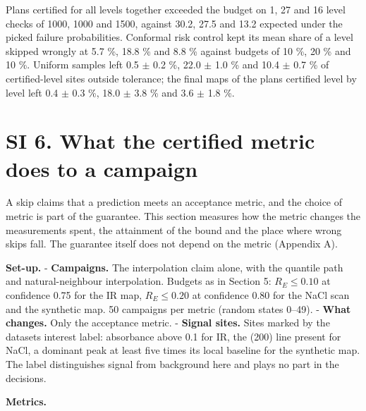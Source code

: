 \documentclass{iopjournal}
\begin{document}
Plans certified for all levels together exceeded the budget on 1, 27 and 16 level checks of 1000, 1000 and 1500, against 30.2, 27.5 and 13.2 expected under the picked failure probabilities. Conformal risk control kept its mean share of a level skipped wrongly at 5.7 \%, 18.8 \% and 8.8 \% against budgets of 10 \%, 20 \% and 10 \%. Uniform samples left 0.5 \ensuremath{\pm} 0.2 \%, 22.0 \ensuremath{\pm} 1.0 \% and 10.4 \ensuremath{\pm} 0.7 \% of certified-level sites outside tolerance; the final maps of the plans certified level by level left 0.4 \ensuremath{\pm} 0.3 \%, 18.0 \ensuremath{\pm} 3.8 \% and 3.6 \ensuremath{\pm} 1.8 \%.

\hypertarget{si-6.-what-the-certified-metric-does-to-a-campaign}{%
\section*{SI 6. What the certified metric does to a campaign}\label{si-6.-what-the-certified-metric-does-to-a-campaign}}

A skip claims that a prediction meets an acceptance metric, and the choice of metric is part of the guarantee. This section measures how the metric changes the measurements spent, the attainment of the bound and the place where wrong skips fall. The guarantee itself does not depend on the metric (Appendix A).

\textbf{Set-up.} - \textbf{Campaigns.} The interpolation claim alone, with the quantile path and natural-neighbour interpolation. Budgets as in Section 5: \(R_E \le 0.10\) at confidence 0.75 for the IR map, \(R_E \le 0.20\) at confidence 0.80 for the NaCl scan and the synthetic map. 50 campaigns per metric (random states 0--49). - \textbf{What changes.} Only the acceptance metric. - \textbf{Signal sites.} Sites marked by the dataset\textquotesingle s interest label: absorbance above 0.1 for IR, the (200) line present for NaCl, a dominant peak at least five times its local baseline for the synthetic map. The label distinguishes signal from background here and plays no part in the decisions.

\textbf{Metrics.}
\end{document}
